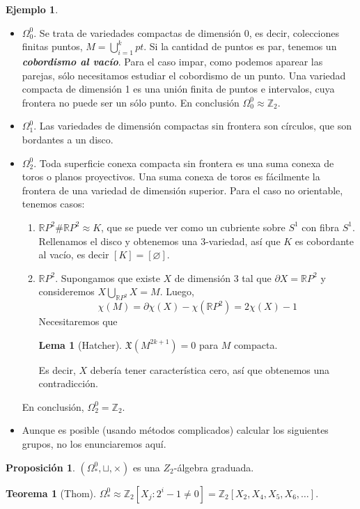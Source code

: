 \documentclass[spanish]{book}
\theoremstyle{definition}
\newtheorem*{lema}{Lema}
\newtheorem*{teo}{Teorema}
\newtheorem*{prop}{Proposición}
\newtheorem*{ejem}{Ejemplo}
\newcommand{\R}{\mathbb{R}}
\newcommand{\Z}{\mathbb{Z}}
\begin{document}
	\begin{ejem}\leavevmode
		\begin{itemize}
			\item $\Omega^0_0$. Se trata de variedades compactas de dimensión 0, es decir, colecciones finitas  puntos, $M=\bigcup_{i=1}^kpt$. Si la cantidad de puntos es par, tenemos un \textbf{\textit{cobordismo al vacío}}. Para el caso impar, como podemos aparear las parejas, sólo necesitamos estudiar el cobordismo de un punto. Una variedad compacta de dimensión 1 es una unión finita de puntos e intervalos, cuya frontera no puede ser un sólo punto. En conclusión $\Omega_0^0\approx\Z_2$.
			
			\item $\Omega^0_1$. Las variedades de dimensión compactas sin frontera son círculos, que son bordantes a un disco.
			
			\item $\Omega^0_2$. Toda superficie conexa compacta sin frontera es una suma conexa de toros o planos proyectivos. Una suma conexa de toros es fácilmente la frontera de una variedad de dimensión superior. Para el caso no orientable, tenemos casos:
			\begin{enumerate}
				\item $\R P^2\#\R P^2\approx K$, que se puede ver como un cubriente sobre $S^1$ con fibra $S^1$. Rellenamos el disco y obtenemos una 3-variedad, así que $K$ es cobordante al vacío, es decir $[K]=[\varnothing]$.
				
				\item $\R P^2$. Supongamos que existe $X$ de dimensión 3 tal que $\partial X=\R P^2$ y consideremos $X\bigcup_{\R P^2}X=M$. Luego,
				\[\chi(M)=\partial \chi(X)-\chi(\R P^2)=2\chi(X)-1\]
				Necesitaremos que
				\begin{lema}[Hatcher]
					$\mathfrak{X}(M^{2k+1})=0$ para $M$ compacta.
				\end{lema}
				Es decir, $X$ debería tener característica cero, así que obtenemos una contradicción. 
			\end{enumerate}
			En conclusión, $\Omega^0_2=\Z_2$.
				\item Aunque es posible (usando métodos complicados) calcular los siguientes grupos, no los enunciaremos aquí.
		\end{itemize}
	\end{ejem}
	\begin{prop}
		$(\Omega^0_*,\sqcup,\times)$ es una $Z_2$-álgebra graduada.
	\end{prop}
	\begin{teo}[Thom]
		$\Omega^0_*\approx\Z_2[X_j:2^i-1\neq0]=\Z_2[X_2,X_4,X_5,X_6,\ldots]$.
	\end{teo}
\end{document}

